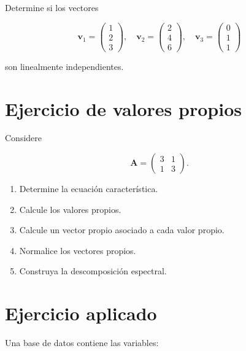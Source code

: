 \documentclass[
  spanish,
  10.5pt,
  letterpaper,
  DIV=11,
  numbers=noendperiod,
  oneside,
  open=any]{scrreprt}
\providecommand{\tightlist}{%
  \setlength{\itemsep}{0pt}\setlength{\parskip}{0pt}}
\theoremstyle{definition}
\theoremstyle{definition}
\theoremstyle{plain}
\theoremstyle{remark}
\begin{document}
Determine si los vectores

\[
\mathbf{v}_1=
\begin{pmatrix}
1\\
2\\
3
\end{pmatrix},
\quad
\mathbf{v}_2=
\begin{pmatrix}
2\\
4\\
6
\end{pmatrix},
\quad
\mathbf{v}_3=
\begin{pmatrix}
0\\
1\\
1
\end{pmatrix}
\]

son linealmente independientes.

\section*{Ejercicio de valores
propios}\label{ejercicio-de-valores-propios}


Considere

\[
\mathbf{A}
=
\begin{pmatrix}
3 & 1\\
1 & 3
\end{pmatrix}.
\]

\begin{enumerate}
\def\labelenumi{\arabic{enumi}.}
\tightlist
\item
  Determine la ecuación característica.
\item
  Calcule los valores propios.
\item
  Calcule un vector propio asociado a cada valor propio.
\item
  Normalice los vectores propios.
\item
  Construya la descomposición espectral.
\end{enumerate}

\section*{Ejercicio aplicado}\label{ejercicio-aplicado}


Una base de datos contiene las variables:
\end{document}
